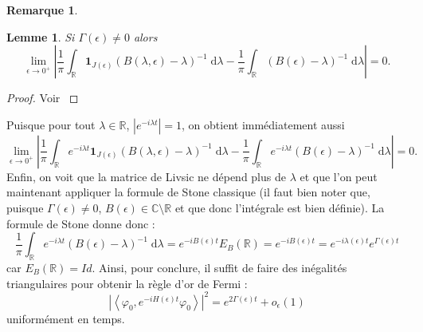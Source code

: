 \documentclass[12pt,openany,a4paper, titlepage]{article}
\newcommand{\f}[2]{\frac{#1}{#2}}
\newcommand{\lp}{\left(}
\newcommand{\rp}{\right)}
\newcommand{\la}{\left\langle}
\newcommand{\ra}{\right\rangle}
\newcommand{\dd}{\;\mathrm{d}}
\newcommand{\R}{\mathbb{R}}
\newcommand{\C}{\mathbb{C}}
\newcommand{\vp}{\varphi}
\newtheorem{lem}{Lemme}
\theoremstyle{definition}
\theoremstyle{definition}
\theoremstyle{definition}
\theoremstyle{definition}
\theoremstyle{definition}
\newtheorem{rem}{Remarque}
\theoremstyle{definition}
\begin{document}
\begin{rem}
\begin{lem}\label{L1conver}
    Si $\Gamma(\epsilon) \neq 0$ alors 
    \begin{equation}
            \lim\limits_{\epsilon \rightarrow 0^+} \left| \f{1}{\pi} \int_\R \mathbf{1}_{J(\epsilon)}\lp  B(\lambda,\epsilon) - \lambda \rp^{-1} \dd \lambda - \f{1}{\pi} \int_\R \lp B(\epsilon) - \lambda \rp^{-1} \dd \lambda \right|= 0.
    \end{equation}
\end{lem}


\begin{proof} Voir \cite{Orth1990}
\end{proof}

Puisque pour tout $\lambda \in \R$, $|e^{-i\lambda t}| = 1$, on obtient immédiatement aussi
\begin{equation}
            \lim\limits_{\epsilon \rightarrow 0^+} \left| \f{1}{\pi} \int_\R e^{-i\lambda t}\mathbf{1}_{J(\epsilon)}\lp  B(\lambda,\epsilon) - \lambda \rp^{-1} \dd \lambda - \f{1}{\pi} \int_\R e^{-i\lambda t}\lp B(\epsilon) - \lambda \rp^{-1} \dd \lambda \right|= 0.
    \end{equation}
Enfin, on voit que la matrice de Livsic ne dépend plus de $\lambda$ et que l'on peut maintenant appliquer la formule de Stone classique (il faut bien noter que, puisque $\Gamma(\epsilon) \neq 0$, $B(\epsilon)\in\C\setminus\R$ et que donc l'intégrale est bien définie). La formule de Stone donne donc :
\begin{equation}
    \f{1}{\pi} \int_\R e^{-i\lambda t}\lp B(\epsilon) - \lambda \rp^{-1} \dd \lambda = e^{-iB(\epsilon)t}E_B(\R) = e^{-iB(\epsilon)t} = e^{-i\lambda(\epsilon)t}e^{\Gamma(\epsilon)t}
\end{equation}
car $E_B(\R) = Id$. Ainsi, pour conclure, il suffit de faire des inégalités triangulaires pour obtenir la règle d'or de Fermi :
\begin{equation}
    \left|\la \vp_0, e^{-iH(\epsilon)t} \vp_0 \ra \right|^2 = e^{2\Gamma(\epsilon)t} + o_{\epsilon}(1)
\end{equation}
uniformément en temps.



\end{rem}
\end{document}
